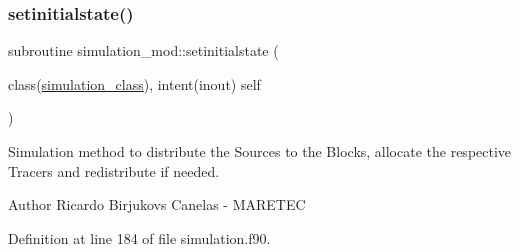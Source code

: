 \subsubsection{\texorpdfstring{setinitialstate()}{setinitialstate()}}
{\footnotesize\ttfamily subroutine simulation\+\_\+mod\+::setinitialstate (\begin{DoxyParamCaption}\item[{class(\mbox{\hyperlink{structsimulation__mod_1_1simulation__class}{simulation\+\_\+class}}), intent(inout)}]{self }\end{DoxyParamCaption})\hspace{0.3cm}{\ttfamily [private]}}



Simulation method to distribute the Sources to the Blocks, allocate the respective Tracers and redistribute if needed. 

\begin{DoxyAuthor}{Author}
Ricardo Birjukovs Canelas -\/ M\+A\+R\+E\+T\+EC 
\end{DoxyAuthor}


Definition at line 184 of file simulation.\+f90.


